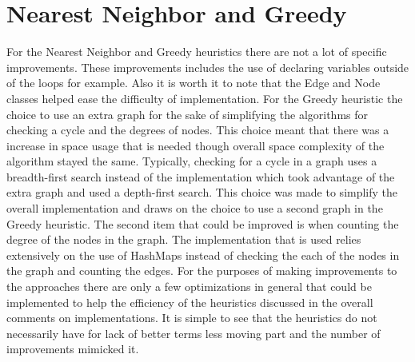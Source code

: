 \documentclass[midd]{thesis}
\newcommand{\tab}{\hspace*{2em}}
\begin{document}
\section{Nearest Neighbor and Greedy}
\tab For the Nearest Neighbor and Greedy heuristics there are not a lot of specific improvements. These improvements includes the use of declaring variables outside of the loops for example. Also it is worth it to note that the Edge and Node classes helped ease the difficulty of implementation. For the Greedy heuristic the choice to use an extra graph for the sake of simplifying the algorithms for checking a cycle and the degrees of nodes. This choice meant that there was a increase in space usage that is needed though overall space complexity of the algorithm stayed the same. Typically, checking for a cycle in a graph uses a breadth-first search instead of the implementation which took advantage of the extra graph and used a depth-first search. This choice was made to simplify the overall implementation and draws on the choice to use a second graph in the Greedy heuristic. The second item that could be improved is when counting the degree of the nodes in the graph. The implementation that is used relies extensively on the use of HashMaps instead of checking the each of the nodes in the graph and counting the edges. For the purposes of making improvements to the approaches there are only a few optimizations in general that could be implemented to help the efficiency of the heuristics discussed in the overall comments on implementations. It is simple to see that the heuristics do not necessarily have for lack of better terms less moving part and the number of improvements mimicked it.\\
\end{document}
